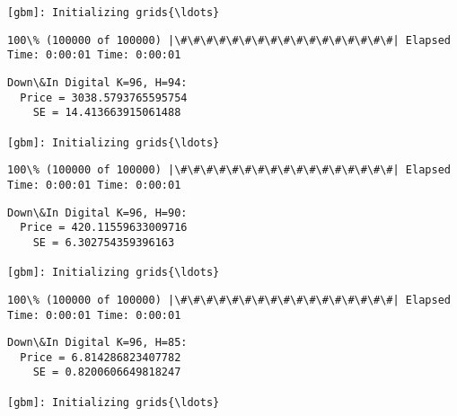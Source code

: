 \documentclass[11pt]{article}
\begin{document}
    \begin{Verbatim}[commandchars=\\\{\}]
[gbm]: Initializing grids{\ldots}

    \end{Verbatim}

    \begin{Verbatim}[commandchars=\\\{\}]
100\% (100000 of 100000) |\#\#\#\#\#\#\#\#\#\#\#\#\#\#\#\#\#| Elapsed Time: 0:00:01 Time: 0:00:01

    \end{Verbatim}

    \begin{Verbatim}[commandchars=\\\{\}]
Down\&In Digital K=96, H=94:
  Price = 3038.5793765595754
    SE = 14.413663915061488

[gbm]: Initializing grids{\ldots}

    \end{Verbatim}

    \begin{Verbatim}[commandchars=\\\{\}]
100\% (100000 of 100000) |\#\#\#\#\#\#\#\#\#\#\#\#\#\#\#\#\#| Elapsed Time: 0:00:01 Time: 0:00:01

    \end{Verbatim}

    \begin{Verbatim}[commandchars=\\\{\}]
Down\&In Digital K=96, H=90:
  Price = 420.11559633009716
    SE = 6.302754359396163

[gbm]: Initializing grids{\ldots}

    \end{Verbatim}

    \begin{Verbatim}[commandchars=\\\{\}]
100\% (100000 of 100000) |\#\#\#\#\#\#\#\#\#\#\#\#\#\#\#\#\#| Elapsed Time: 0:00:01 Time: 0:00:01

    \end{Verbatim}

    \begin{Verbatim}[commandchars=\\\{\}]
Down\&In Digital K=96, H=85:
  Price = 6.814286823407782
    SE = 0.8200606649818247

[gbm]: Initializing grids{\ldots}

    \end{Verbatim}
\end{document}
